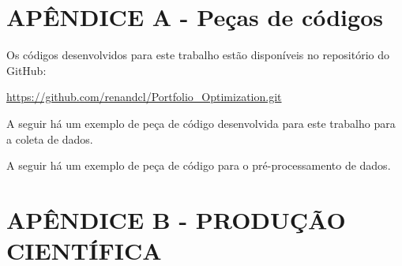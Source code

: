 \appendix

    \section*{APÊNDICE A - Peças de códigos}
        
        \ipar Os códigos desenvolvidos para este trabalho estão disponíveis no repositório do GitHub: 
        
        \url{https://github.com/renandcl/Portfolio_Optimization.git}

        \ipar A seguir há um exemplo de peça de código desenvolvida para este trabalho para a coleta de dados.

        

        \ipar A seguir há um exemplo de peça de código para o pré-processamento de dados.

        

    \pagebreak
    
    \section*{APÊNDICE B - PRODUÇÃO CIENTÍFICA}
        
